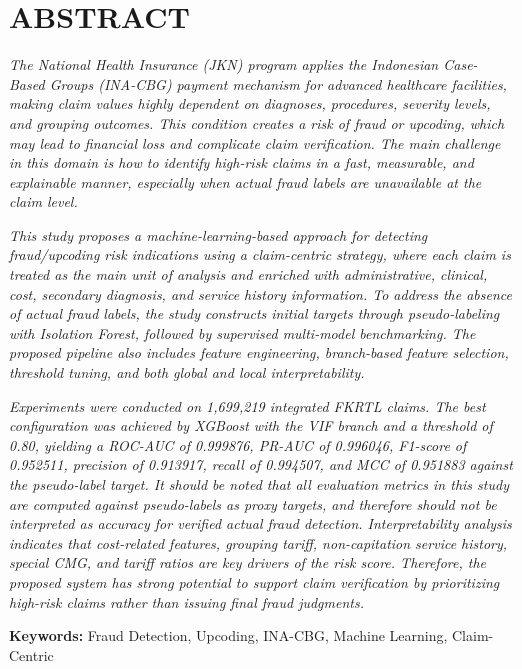 \cleardoublepage
\chapter*{ABSTRACT}
\thispagestyle{fancy}

\textit{The National Health Insurance (JKN) program applies the Indonesian Case-Based Groups (INA-CBG) payment mechanism for advanced healthcare facilities, making claim values highly dependent on diagnoses, procedures, severity levels, and grouping outcomes. This condition creates a risk of fraud or upcoding, which may lead to financial loss and complicate claim verification. The main challenge in this domain is how to identify high-risk claims in a fast, measurable, and explainable manner, especially when actual fraud labels are unavailable at the claim level.}

\textit{This study proposes a machine-learning-based approach for detecting fraud/upcoding risk indications using a claim-centric strategy, where each claim is treated as the main unit of analysis and enriched with administrative, clinical, cost, secondary diagnosis, and service history information. To address the absence of actual fraud labels, the study constructs initial targets through pseudo-labeling with Isolation Forest, followed by supervised multi-model benchmarking. The proposed pipeline also includes feature engineering, branch-based feature selection, threshold tuning, and both global and local interpretability.}

\textit{Experiments were conducted on 1,699,219 integrated FKRTL claims. The best configuration was achieved by XGBoost with the VIF branch and a threshold of 0.80, yielding a ROC-AUC of 0.999876, PR-AUC of 0.996046, F1-score of 0.952511, precision of 0.913917, recall of 0.994507, and MCC of 0.951883 against the pseudo-label target. It should be noted that all evaluation metrics in this study are computed against pseudo-labels as proxy targets, and therefore should not be interpreted as accuracy for verified actual fraud detection. Interpretability analysis indicates that cost-related features, grouping tariff, non-capitation service history, special CMG, and tariff ratios are key drivers of the risk score. Therefore, the proposed system has strong potential to support claim verification by prioritizing high-risk claims rather than issuing final fraud judgments.}

\vspace{1cm}
\noindent\textbf{Keywords:} Fraud Detection, Upcoding, INA-CBG, Machine Learning, Claim-Centric
